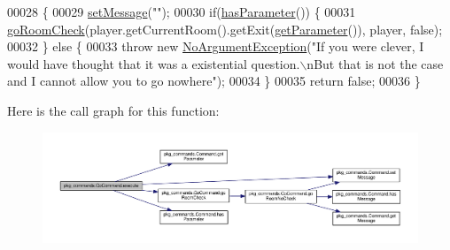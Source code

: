 \begin{DoxyCode}
00028                                                                                                            
                              \{
00029         \hyperlink{classpkg__commands_1_1Command_ae210ff216fe908b111ba1c988a963d13}{setMessage}(\textcolor{stringliteral}{""});
00030         \textcolor{keywordflow}{if}(\hyperlink{classpkg__commands_1_1Command_a02af95ab3f1898a66259ab7c177b6998}{hasParameter}()) \{
00031             \hyperlink{classpkg__commands_1_1GoCommand_acbf1aa81fa5b1aef7cafb8b4e3ace3a9}{goRoomCheck}(player.getCurrentRoom().getExit(\hyperlink{classpkg__commands_1_1Command_a41c92d445be73ea9d62320c65efb8434}{getParameter}()), player, \textcolor{keyword}{
      false});
00032         \} \textcolor{keywordflow}{else} \{
00033             \textcolor{keywordflow}{throw} \textcolor{keyword}{new} \hyperlink{classpkg__exceptions_1_1NoArgumentException}{NoArgumentException}(\textcolor{stringliteral}{"If you were clever, I would have thought that
       it was a existential question.\(\backslash\)nBut that is not the case and I cannot allow you to go nowhere"});
00034         \}
00035         \textcolor{keywordflow}{return} \textcolor{keyword}{false};
00036     \}
\end{DoxyCode}


Here is the call graph for this function\-:
\nopagebreak
\begin{figure}[H]
\begin{center}
\leavevmode
\includegraphics[width=350pt]{classpkg__commands_1_1GoCommand_a82e9a64a0fac612f788060a90c83f9b1_cgraph}
\end{center}
\end{figure}


